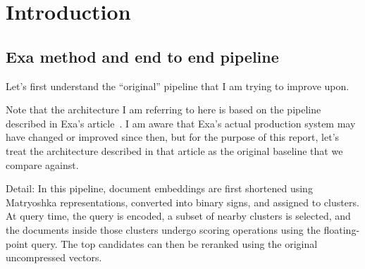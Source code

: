 \begin{abstract}
Following Exa’s published work on binary embedding search, this report looks at the stage after nearby clusters have already been selected, where a floating-point query is compared against binary document vectors inside those clusters.

The key observation is that, from the query itself, we already know what the ideal binary document would look like and how costly each bit mismatch is. This raises a simple question: can we use that information to search the selected documents more efficiently than just scoring all of them?

I compare the original full scan with two alternatives: \textbf{Bitplanes}, which filters documents using the most important query bits, and \textbf{Backward Walk}, which starts from a specific binary prefix and broadens the search backwards. The goal is to see whether the extra search work can save enough query-document dot product operations to reduce latency at the same recall.
\end{abstract}

\section{Introduction}

\subsection{Exa method and end to end pipeline}
Let's first understand the ``original'' pipeline that I am trying to improve upon.

Note that the architecture I am referring to here is based on the pipeline described in
Exa's article~\cite{exa}. I am aware that Exa's actual production system may have changed or
improved since then, but for the purpose of this report, let's treat the architecture
described in that article as the original baseline that we compare against.

Detail: In this pipeline, document embeddings are first shortened using Matryoshka
representations, converted into binary signs, and assigned to clusters. At query time,
the query is encoded, a subset of nearby clusters is selected, and the documents inside
those clusters undergo scoring operations using the floating-point query. The top candidates can then be
reranked using the original uncompressed vectors.

